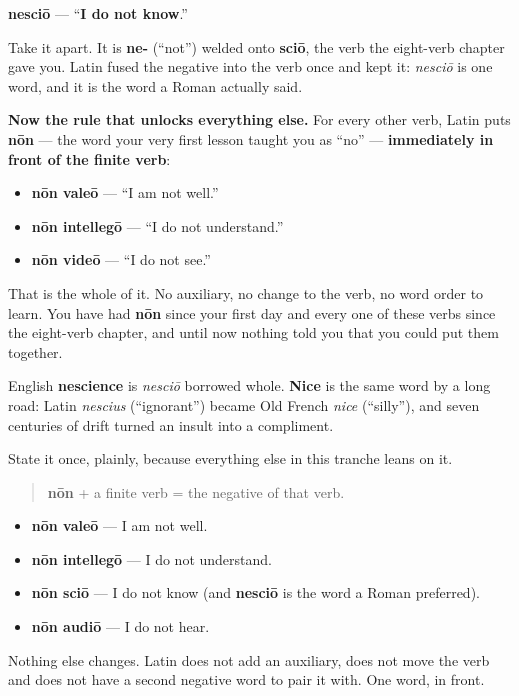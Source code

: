\begin{cousinweb}
\textbf{nesciō} — \textquotedblleft{}\textbf{I do not know}.\textquotedblright{}

Take it apart. It is \textbf{ne-} (\textquotedblleft{}not\textquotedblright{}) welded onto \textbf{sciō}, the verb the eight-verb chapter gave you. Latin fused the negative into the verb once and kept it: \emph{nesciō} is one word, and it is the word a Roman actually said.

\textbf{Now the rule that unlocks everything else.} For every other verb, Latin puts \textbf{nōn} — the word your very first lesson taught you as \textquotedblleft{}no\textquotedblright{} — \textbf{immediately in front of the finite verb}:

\begin{itemize}
\raggedright
  \item \textbf{nōn valeō} — \textquotedblleft{}I am not well.\textquotedblright{}
  \item \textbf{nōn intellegō} — \textquotedblleft{}I do not understand.\textquotedblright{}
  \item \textbf{nōn videō} — \textquotedblleft{}I do not see.\textquotedblright{}
\end{itemize}

That is the whole of it. No auxiliary, no change to the verb, no word order to learn. You have had \textbf{nōn} since your first day and every one of these verbs since the eight-verb chapter, and until now nothing told you that you could put them together.

English \textbf{nescience} is \emph{nesciō} borrowed whole. \textbf{Nice} is the same word by a long road: Latin \emph{nescius} (\textquotedblleft{}ignorant\textquotedblright{}) became Old French \emph{nice} (\textquotedblleft{}silly\textquotedblright{}), and seven centuries of drift turned an insult into a compliment.
\end{cousinweb}

\begin{grammarlens}[title={Grammar Lens: non goes in front of the verb}]
State it once, plainly, because everything else in this tranche leans on it.

\begin{quote}
\textbf{nōn} + a finite verb = the negative of that verb.
\end{quote}

\begin{itemize}
\raggedright
  \item \textbf{nōn valeō} — I am not well.
  \item \textbf{nōn intellegō} — I do not understand.
  \item \textbf{nōn sciō} — I do not know (and \textbf{nesciō} is the word a Roman preferred).
  \item \textbf{nōn audiō} — I do not hear.
\end{itemize}

Nothing else changes. Latin does not add an auxiliary, does not move the verb and does not have a second negative word to pair it with. One word, in front.
\end{grammarlens}

